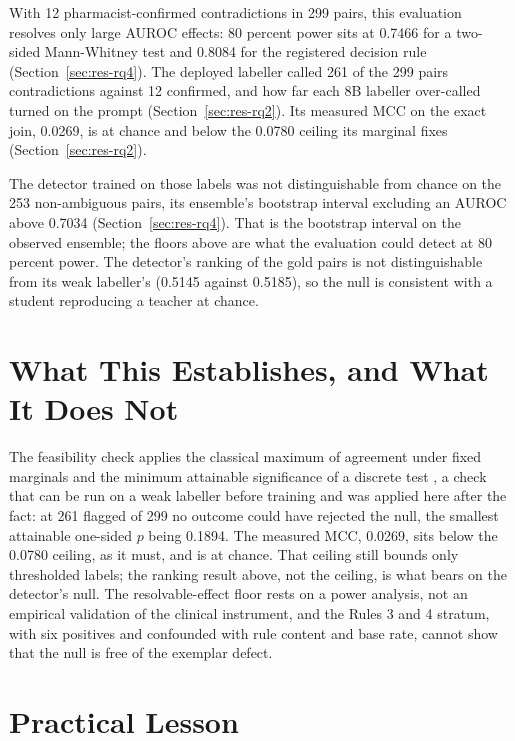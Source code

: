 With 12 pharmacist-confirmed contradictions in 299 pairs, this evaluation
resolves only large AUROC effects: 80 percent power sits at 0.7466 for a
two-sided Mann-Whitney test and 0.8084 for the registered decision rule
(Section~\ref{sec:res-rq4}). The deployed labeller called 261 of the 299
pairs contradictions against 12 confirmed, and how far each 8B labeller
over-called turned on the prompt (Section~\ref{sec:res-rq2}). Its measured
MCC on the exact join, 0.0269, is at chance and below the 0.0780 ceiling its
marginal fixes (Section~\ref{sec:res-rq2}).

The detector trained on those labels was not distinguishable from chance on
the 253 non-ambiguous pairs, its ensemble's bootstrap interval excluding an
AUROC above 0.7034 (Section~\ref{sec:res-rq4}). That is the bootstrap interval
on the observed ensemble; the floors above are what the evaluation could detect
at 80 percent power. The detector's ranking of the gold pairs is not
distinguishable from its weak labeller's (0.5145 against 0.5185), so the null is
consistent with a student reproducing a teacher at chance.

\section{What This Establishes, and What It Does Not}
\label{sec:conc-establishes}

The feasibility check applies the classical maximum of agreement under fixed
marginals and the minimum attainable significance of a discrete test
\citep{cohen1960kappa,tarone1990modified}, a check that can be run on a weak
labeller before training and was applied here after the fact: at 261 flagged
of 299 no outcome could have rejected the null, the smallest attainable
one-sided $p$ being 0.1894. The measured MCC, 0.0269, sits below the
0.0780 ceiling, as it must, and is at chance. That ceiling still bounds only thresholded labels; the
ranking result above, not the ceiling, is what bears on the detector's null. The
resolvable-effect floor rests on a power analysis, not an empirical
validation of the clinical instrument, and the Rules 3 and 4 stratum, with
six positives and confounded with rule content and base rate, cannot show that
the null is free of the exemplar defect.

\section{Practical Lesson}
\label{sec:conc-practice}

